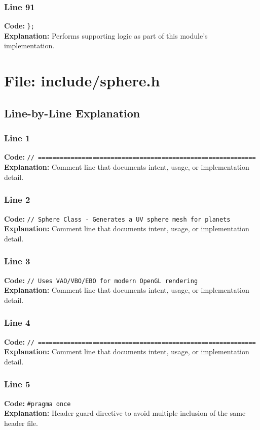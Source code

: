 \documentclass[11pt,a4paper]{article}
\begin{document}
\subsubsection*{Line 91}
\textbf{Code:} \verb|};|\\
\textbf{Explanation:} Performs supporting logic as part of this module's implementation.

\newpage
\section{File: include/sphere.h}
\subsection{Line-by-Line Explanation}
\subsubsection*{Line 1}
\textbf{Code:} \verb|// ============================================================|\\
\textbf{Explanation:} Comment line that documents intent, usage, or implementation detail.

\subsubsection*{Line 2}
\textbf{Code:} \verb|// Sphere Class - Generates a UV sphere mesh for planets|\\
\textbf{Explanation:} Comment line that documents intent, usage, or implementation detail.

\subsubsection*{Line 3}
\textbf{Code:} \verb|// Uses VAO/VBO/EBO for modern OpenGL rendering|\\
\textbf{Explanation:} Comment line that documents intent, usage, or implementation detail.

\subsubsection*{Line 4}
\textbf{Code:} \verb|// ============================================================|\\
\textbf{Explanation:} Comment line that documents intent, usage, or implementation detail.

\subsubsection*{Line 5}
\textbf{Code:} \verb|#pragma once|\\
\textbf{Explanation:} Header guard directive to avoid multiple inclusion of the same header file.
\end{document}
